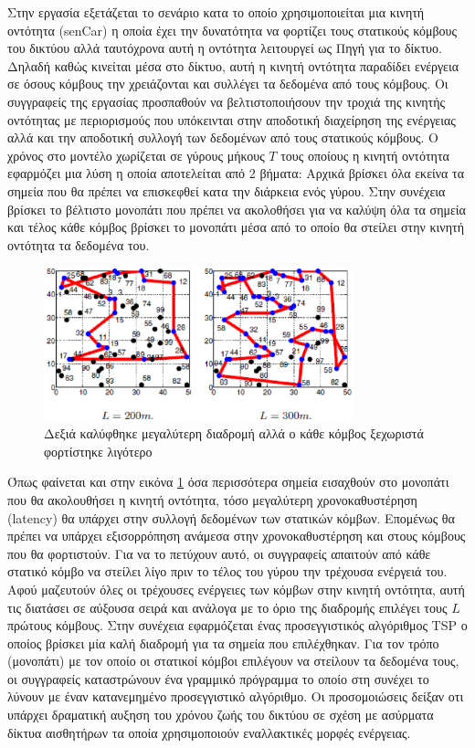 Στην εργασία \cite{yuanyuan_joint} εξετάζεται το σενάριο κατα το οποίο χρησιμοποιείται μια κινητή οντότητα (senCar) η οποία έχει την δυνατότητα να φορτίζει τους
στατικούς κόμβους του δικτύου αλλά ταυτόχρονα αυτή η οντότητα λειτουργεί ως Πηγή για το δίκτυο. Δηλαδή καθώς κινείται μέσα στο δίκτυο, αυτή η κινητή οντότητα
παραδίδει ενέργεια σε όσους κόμβους την χρειάζονται και συλλέγει τα δεδομένα από τους κόμβους. Οι συγγραφείς της εργασίας προσπαθούν να βελτιστοποιήσουν την τροχιά
της κινητής οντότητας με περιορισμούς που υπόκεινται στην αποδοτική διαχείρηση της ενέργειας αλλά και την αποδοτική συλλογή των δεδομένων από τους στατικούς
κόμβους. Ο χρόνος στο μοντέλο χωρίζεται σε γύρους μήκους $T$ τους οποίους η κινητή οντότητα εφαρμόζει μια λύση η οποία αποτελείται από 2 βήματα: Αρχικά βρίσκει όλα
εκείνα τα σημεία που θα πρέπει να επισκεφθεί κατα την διάρκεια ενός γύρου. Στην συνέχεια βρίσκει το βέλτιστο μονοπάτι που πρέπει να ακολοθήσει για να καλύψη όλα τα
σημεία και τέλος κάθε κόμβος βρίσκει το μονοπάτι μέσα από το οποίο θα στείλει στην κινητή οντότητα τα δεδομένα του.

\begin{figure}[h]
	\centering
	\includegraphics[width=0.8\textwidth]{images/yuanyuan_recharg_paths.eps}
	\caption{Δεξιά καλύφθηκε μεγαλύτερη διαδρομή αλλά ο κάθε κόμβος ξεχωριστά φορτίστηκε λιγότερο}
	\label{fig:yuanyuan_recharg_paths}
\end{figure}
Όπως φαίνεται και στην εικόνα \ref{fig:yuanyuan_recharg_paths} όσα περισσότερα σημεία εισαχθούν στο μονοπάτι που θα ακολουθήσει η κινητή οντότητα, τόσο
μεγαλύτερη χρονοκαθυστέρηση (latency) θα υπάρχει στην συλλογή δεδομένων των στατικών κόμβων. Επομένως θα πρέπει να υπάρχει εξισορρόπηση ανάμεσα στην χρονοκαθυστέρηση
και στους κόμβους που θα φορτιστούν. Για να το πετύχουν αυτό, οι συγγραφείς απαιτούν από κάθε στατικό κόμβο να στείλει λίγο πριν το τέλος του γύρου την τρέχουσα
ενέργειά του. Αφού μαζευτούν όλες οι τρέχουσες ενέργειες των κόμβων στην κινητή οντότητα, αυτή τις διατάσει σε αύξουσα σειρά και ανάλογα με το όριο της διαδρομής
επιλέγει τους $L$ πρώτους κόμβους. Στην συνέχεια εφαρμόζεται ένας προσεγγιστικός αλγόριθμος TSP ο οποίος βρίσκει μία καλή διαδρομή για τα σημεία που επιλέχθηκαν. Για
τον τρόπο (μονοπάτι) με τον οποίο οι στατικοί κόμβοι επιλέγουν να στείλουν τα δεδομένα τους, οι συγγραφείς καταστρώνουν ένα γραμμικό πρόγραμμα το οποίο στη συνέχει το
λύνουν με έναν κατανεμημένο προσεγγιστικό αλγόριθμο. Οι προσομοιώσεις δείξαν οτι υπάρχει δραματική αυξηση του χρόνου ζωής του δικτύου σε σχέση με ασύρματα δίκτυα
αισθητήρων τα οποία χρησιμοποιούν εναλλακτικές μορφές ενέργειας.


